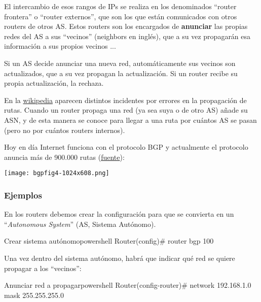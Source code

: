 El intercambio de esos rangos de IPs se realiza en los denominados “router frontera” o “router externos”, que son los que están comunicados con otros routers de otros AS. Estos routers son los encargados de \textbf{anunciar} las propias redes del AS a sus “vecinos” (neighbors en inglés), que a su vez propagarán esa información a sus propios vecinos ...

Si un AS decide anunciar una nueva red, automáticamente sus vecinos son actualizados, que a su vez propagan la actualización. Si un router recibe su propia actualización, la rechaza.


En la \href{https://en.wikipedia.org/wiki/BGP_hijacking}{wikipedia} aparecen distintos incidentes por errores en la propagación de rutas.
Cuando un router propaga una red (ya sea suya o de otro AS) añade su ASN, y de esta manera se conoce para llegar a una ruta por cuántos AS se pasan (pero no por cuántos routers internos).

Hoy en día Internet funciona con el protocolo BGP y actualmente el protocolo anuncia más de 900.000 rutas (\href{https://blog.apnic.net/2022/01/06/bgp-in-2021-the-bgp-table/}{fuente}):

\begin{center}
    \vspace{-15pt}
    \texttt{[image: bgpfig4-1024x608.png]}
    \vspace{-25pt}
\end{center}


\subsubsection{Ejemplos}
En los routers debemos crear la configuración para que se convierta en un “\textit{Autonomous System}” (AS, Sistema Autónomo).

\begin{mycode}{Crear sistema autónomo}{powershell}{}
Router(config)# router bgp 100
\end{mycode}

Una vez dentro del sistema autónomo, habrá que indicar qué red se quiere propagar a los “vecinos”:

\begin{mycode}{Anunciar red a propagar}{powershell}{}
Router(config-router)# network 192.168.1.0 mask 255.255.255.0
\end{mycode}

